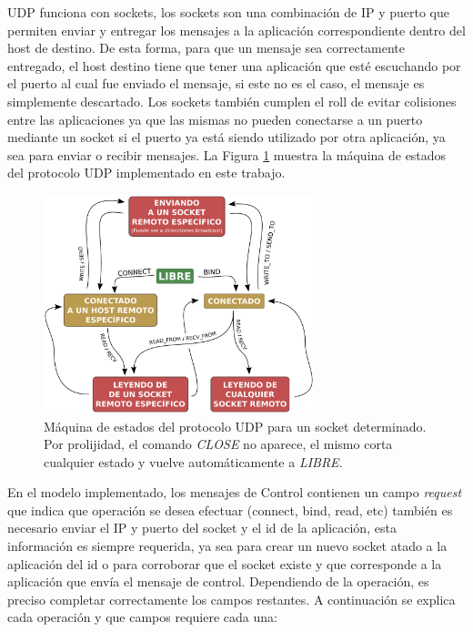 \documentclass[10pt,a4paper]{article}
\begin{document}
UDP funciona con sockets, los sockets son una combinación de IP y puerto que permiten enviar y entregar los mensajes a la aplicación correspondiente dentro del host de destino. De esta forma, para que un mensaje sea correctamente entregado, el host destino tiene que tener una aplicación que esté escuchando por el puerto al cual fue enviado el mensaje, si este no es el caso, el mensaje es simplemente descartado. Los sockets también cumplen el roll de evitar colisiones entre las aplicaciones ya que las mismas no pueden conectarse a un puerto mediante un socket si el puerto ya está siendo utilizado por otra aplicación, ya sea para enviar o recibir mensajes. La Figura \ref{figure: UPD state machine} muestra la máquina de estados del protocolo UDP implementado en este trabajo. \\

\begin{figure}[!hb]
    \centering
    \includegraphics[width = 0.7\textwidth]{img/png/UDP-state-machine.png}
    \caption{Máquina de estados del protocolo UDP para un socket determinado. Por prolijidad, el comando \textit{CLOSE} no aparece, el mismo corta cualquier estado y vuelve automáticamente a \textit{LIBRE}.}
    \label{figure: UPD state machine}
\end{figure}
 
En el modelo implementado, los mensajes de Control contienen un campo \textit{request} que indica que operación se desea efectuar (connect, bind, read, etc) también es necesario enviar el IP y puerto del socket y el id de la aplicación, esta información es siempre requerida, ya sea para crear un nuevo socket atado a la aplicación del id o para corroborar que el socket existe y que corresponde a la aplicación que envía el mensaje de control. Dependiendo de la operación, es preciso completar correctamente los campos restantes. A continuación se explica cada operación y que campos requiere cada una: \\
\end{document}
